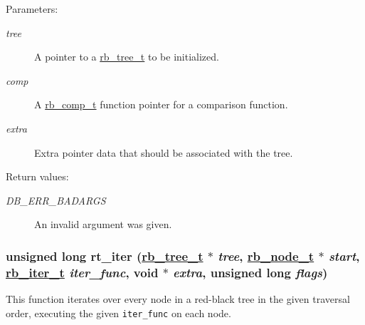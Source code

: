 \begin{Desc}
\item[Parameters:]
\begin{description}
\item[{\em tree}]A pointer to a \hyperlink{group__dbprim__rbtree_a0}{rb\_\-tree\_\-t} to be initialized. \item[{\em comp}]A \hyperlink{group__dbprim__rbtree_a3}{rb\_\-comp\_\-t} function pointer for a comparison function. \item[{\em extra}]Extra pointer data that should be associated with the tree.\end{description}
\end{Desc}
\begin{Desc}
\item[Return values:]
\begin{description}
\item[{\em DB\_\-ERR\_\-BADARGS}]An invalid argument was given. \end{description}
\end{Desc}
\hypertarget{group__dbprim__rbtree_a11}{
\subsubsection[rt\_\-iter]{\setlength{\rightskip}{0pt plus 5cm}unsigned long rt\_\-iter (\hyperlink{dbprim_8h_a0}{rb\_\-tree\_\-t} $\ast$ {\em tree}, \hyperlink{dbprim_8h_a1}{rb\_\-node\_\-t} $\ast$ {\em start}, \hyperlink{dbprim_8h_a2}{rb\_\-iter\_\-t} {\em iter\_\-func}, void $\ast$ {\em extra}, unsigned long {\em flags})}}
\label{group__dbprim__rbtree_a11}


This function iterates over every node in a red-black tree in the given traversal order, executing the given {\tt iter\_\-func} on each node.

